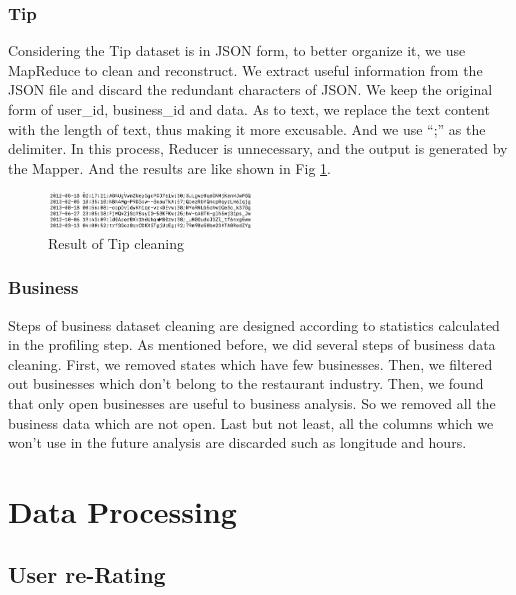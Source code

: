 \documentclass{stylefiles/capstone}
\begin{document}
\subsubsection{\textbf{Tip}}
Considering the Tip dataset is in JSON form, to better organize it, we use MapReduce to clean and reconstruct. We extract useful information from the JSON file and discard the redundant characters of JSON. We keep the original form of user\_id, business\_id and data. As to text, we replace the text content with the length of text, thus making it more excusable. And we use “;” as the delimiter. In this process, Reducer is unnecessary, and the output is generated by the Mapper. And the results are like shown in Fig \ref{tipclean}.

\begin{figure}[htbp]
\centering
\includegraphics[width=0.48\textwidth]{asset/tipclean.png}
\caption{Result of Tip cleaning}
\label{tipclean}
\end{figure}
\subsubsection{\textbf{Business}}
Steps of business dataset cleaning are designed according to statistics calculated in the profiling step. As mentioned before, we did several steps of business data cleaning. First, we removed states which have few businesses. Then, we filtered out businesses which don't belong to the restaurant industry. Then, we found that only open businesses are useful to business analysis. So we removed all the business data which are not open. Last but not least, all the columns which we won't use in the future analysis are discarded such as longitude and hours.

\section{Data Processing}
\subsection{User re-Rating}\label{user_rerating}
\end{document}
